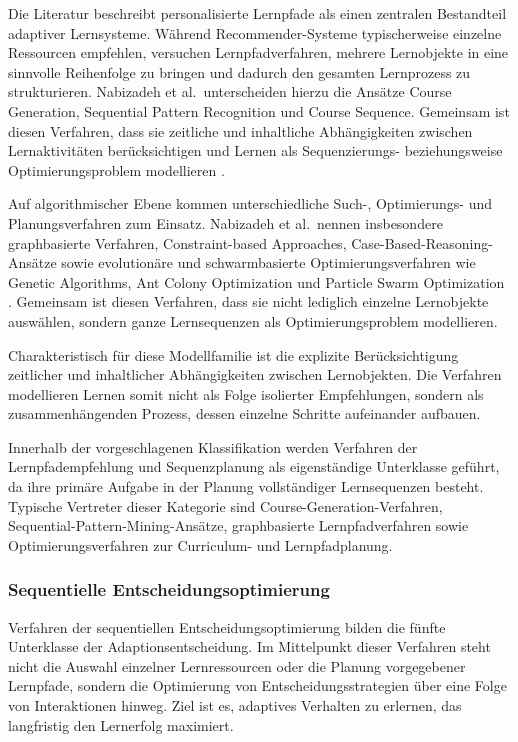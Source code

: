 Die Literatur beschreibt personalisierte Lernpfade als einen zentralen
Bestandteil adaptiver Lernsysteme. Während Recommender-Systeme
typischerweise einzelne Ressourcen empfehlen, versuchen
Lernpfadverfahren, mehrere Lernobjekte in eine sinnvolle Reihenfolge zu
bringen und dadurch den gesamten Lernprozess zu strukturieren. Nabizadeh
et al.~unterscheiden hierzu die Ansätze Course Generation, Sequential
Pattern Recognition und Course Sequence. Gemeinsam ist diesen Verfahren,
dass sie zeitliche und inhaltliche Abhängigkeiten zwischen
Lernaktivitäten berücksichtigen und Lernen als Sequenzierungs-
beziehungsweise Optimierungsproblem modellieren \citep{Nabizadeh2020}.

Auf algorithmischer Ebene kommen unterschiedliche Such-, Optimierungs-
und Planungsverfahren zum Einsatz. Nabizadeh et al.~nennen insbesondere
graphbasierte Verfahren, Constraint-based Approaches,
Case-Based-Reasoning-Ansätze sowie evolutionäre und schwarmbasierte
Optimierungsverfahren wie Genetic Algorithms, Ant Colony Optimization
und Particle Swarm Optimization \citep{Nabizadeh2020}. Gemeinsam ist
diesen Verfahren, dass sie nicht lediglich einzelne Lernobjekte
auswählen, sondern ganze Lernsequenzen als Optimierungsproblem
modellieren.

Charakteristisch für diese Modellfamilie ist die explizite
Berücksichtigung zeitlicher und inhaltlicher Abhängigkeiten zwischen
Lernobjekten. Die Verfahren modellieren Lernen somit nicht als Folge
isolierter Empfehlungen, sondern als zusammenhängenden Prozess, dessen
einzelne Schritte aufeinander aufbauen.

Innerhalb der vorgeschlagenen Klassifikation werden Verfahren der
Lernpfadempfehlung und Sequenzplanung als eigenständige Unterklasse
geführt, da ihre primäre Aufgabe in der Planung vollständiger
Lernsequenzen besteht. Typische Vertreter dieser Kategorie sind
Course-Generation-Verfahren, Sequential-Pattern-Mining-Ansätze,
graphbasierte Lernpfadverfahren sowie Optimierungsverfahren zur
Curriculum- und Lernpfadplanung.

\subsubsection{Sequentielle
Entscheidungsoptimierung}\label{sequentielle-entscheidungsoptimierung}

Verfahren der sequentiellen Entscheidungsoptimierung bilden die fünfte
Unterklasse der Adaptionsentscheidung. Im Mittelpunkt dieser Verfahren
steht nicht die Auswahl einzelner Lernressourcen oder die Planung
vorgegebener Lernpfade, sondern die Optimierung von
Entscheidungsstrategien über eine Folge von Interaktionen hinweg. Ziel
ist es, adaptives Verhalten zu erlernen, das langfristig den Lernerfolg
maximiert.

